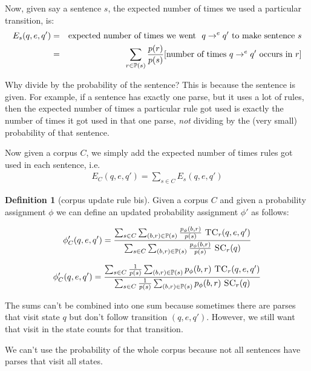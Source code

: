 \documentclass[12pt]{article}
\theoremstyle{definition}
\newtheorem{definition}{Definition}[section]
\begin{document}
Now, given say a sentence $s$, the expected number of times we used a particular transition, is:
\begin{eqnarray*}
  E_s(q,e,q') & = & \textrm{expected number of times we went }~q\rightarrow^eq'~\textrm{to make sentence}~s \\
              & = & \sum_{r\in\mathbb{P}(s)}\frac{p(r)}{p(s)}[\textrm{number of times}~q\rightarrow^eq'\textrm{ occurs in }r ]
  \end{eqnarray*}

Why divide by the probability of the sentence? This is because the sentence is given. For example, if a sentence has exactly one parse, but it uses a lot of rules, then the expected number of times a particular rule got used is exactly the number of times it got used in that one parse, \emph{not} dividing by the (very small) probability of that sentence.



Now given a corpus $C$, we simply add the expected number of times rules got used in each sentence, i.e.
\begin{eqnarray*}
  E_C(q,e,q') = \sum_{s\in C}E_s(q,e,q')
\end{eqnarray*}



\begin{definition}[corpus update rule bis]
  Given a corpus $C$ and given a probability assignment $\phi$ we can define an updated probability assignment $\phi'$ as follows:

  $$\phi_C'(q,e,q') = \frac{\sum_{s\in C}\sum_{(b,r)\in\mathbb{P}(s)} \frac{p_\phi(b,r)}{p(s)}~ \textsc{TC}_r(q,e,q')}{\sum_{s\in C}\sum_{(b,r)\in\mathbb{P}(s)} \frac{p_\phi(b,r)}{p(s)}~ \textsc{SC}_r(q)}$$ 

  $$\phi_C'(q,e,q') = \frac{\sum_{s\in C}\frac{1}{p(s)}\sum_{(b,r)\in\mathbb{P}(s)} p_\phi(b,r)~ \textsc{TC}_r(q,e,q')}{\sum_{s\in C}\frac{1}{p(s)}\sum_{(b,r)\in\mathbb{P}(s)} p_\phi(b,r)~ \textsc{SC}_r(q)}$$ 

\end{definition}



The sums can't be combined into one sum because sometimes there are parses that visit state $q$ but don't follow transition $(q,e,q')$. However, we still want that visit in the state counts for that transition.

We can't use the probability of the whole corpus because not all sentences have parses that visit all states.
\end{document}
